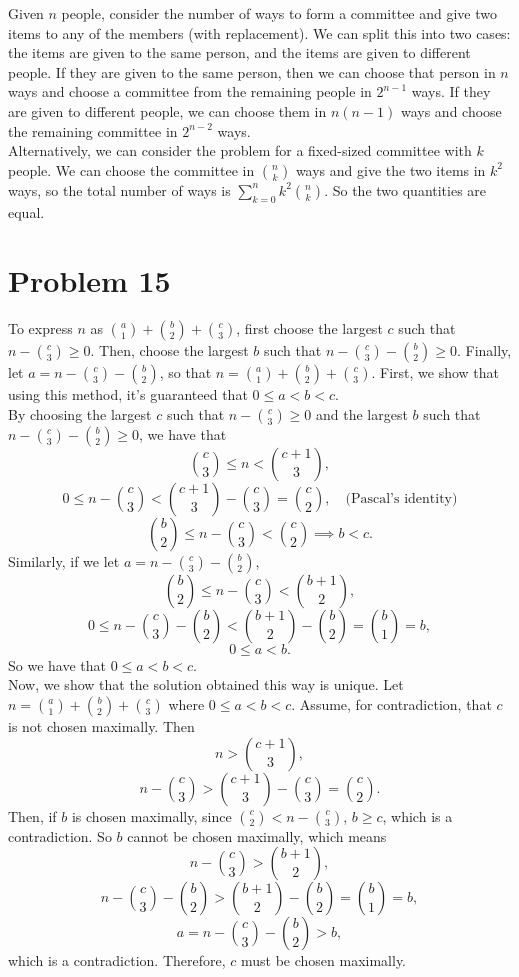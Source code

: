 \documentclass{article}
\begin{document}
Given $n$ people, consider the number of ways to form a committee and give two items to any of the members (with replacement). We can split this into two cases: the items are given to the same person, and the items are given to different people. If they are given to the same person, then we can choose that person in $n$ ways and choose a committee from the remaining people in $2^{n - 1}$ ways. If they are given to different people, we can choose them in $n(n - 1)$ ways and choose the remaining committee in $2^{n - 2}$ ways. \\

Alternatively, we can consider the problem for a fixed-sized committee with $k$ people. We can choose the committee in $\binom{n}{k}$ ways and give the two items in $k^2$ ways, so the total number of ways is $\sum_{k = 0}^n k^2\binom{n}{k}$. So the two quantities are equal.

\section*{Problem 15}

To express $n$ as $\binom{a}{1} + \binom{b}{2} + \binom{c}{3}$, first choose the largest $c$ such that $n - \binom{c}{3} \ge 0$. Then, choose the largest $b$ such that $n - \binom{c}{3} - \binom{b}{2} \ge 0$. Finally, let $a = n - \binom{c}{3} - \binom{b}{2}$, so that $n = \binom{a}{1} + \binom{b}{2} + \binom{c}{3}$. First, we show that using this method, it's guaranteed that $0 \le a < b < c$. \\

By choosing the largest $c$ such that $n - \binom{c}{3} \ge 0$ and the largest $b$ such that $n - \binom{c}{3} - \binom{b}{2} \ge 0$, we have that
$$\binom{c}{3} \le n < \binom{c + 1}{3},$$
$$0 \le n - \binom{c}{3} < \binom{c + 1}{3} - \binom{c}{3} = \binom{c}{2}, \quad \text{(Pascal's identity)}$$
$$\binom{b}{2} \le n - \binom{c}{3} < \binom{c}{2} \implies b < c.$$
Similarly, if we let $a = n - \binom{c}{3} - \binom{b}{2}$,
$$\binom{b}{2} \le n - \binom{c}{3} < \binom{b + 1}{2},$$
$$0 \le n - \binom{c}{3} - \binom{b}{2} < \binom{b + 1}{2} - \binom{b}{2} = \binom{b}{1} = b,$$
$$0 \le a < b.$$
So we have that $0 \le a < b < c$. \\

Now, we show that the solution obtained this way is unique. Let $n = \binom{a}{1} + \binom{b}{2} + \binom{c}{3}$ where $0 \le a < b < c$. Assume, for contradiction, that $c$ is not chosen maximally. Then
$$n > \binom{c + 1}{3},$$
$$n - \binom{c}{3} > \binom{c + 1}{3} - \binom{c}{3} = \binom{c}{2}.$$
Then, if $b$ is chosen maximally, since $\binom{c}{2} < n - \binom{c}{3}$, $b \ge c$, which is a contradiction. So $b$ cannot be chosen maximally, which means
$$n - \binom{c}{3} > \binom{b + 1}{2},$$
$$n - \binom{c}{3} - \binom{b}{2} > \binom{b + 1}{2} - \binom{b}{2} = \binom{b}{1} = b,$$
$$a = n - \binom{c}{3} - \binom{b}{2} > b,$$
which is a contradiction. Therefore, $c$ must be chosen maximally. \\
\end{document}
